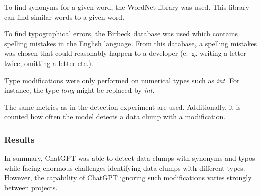To find synonyms for a given word, the WordNet \cite{10.7551/mitpress/7287.001.0001} library was used. This library can find similar words to a given word.

To find typographical errors, the Birbeck database \cite{birbeck} was used which contains spelling mistakes in the English language. From this database, a spelling mistakes was chosen that could reasonably happen to a developer (e.~g. writing a letter twice, omitting a letter etc.). 

Type modifications were only performed on numerical types such as \textit{int}. For instance,  the type \textit{long} might be replaced by \textit{int}. 

The same metrics as in the detection experiment are used. Additionally, it is counted how often the model detects a data clump with a modification. 





\subsubsection{Results}

In summary, ChatGPT was able to detect data clumps with synonyms and typos while facing enormous challenges identifying data clumps with different types. However, the capability of ChatGPT ignoring such modifications varies strongly between projects. 

